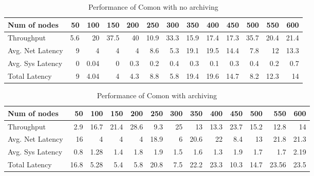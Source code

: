 \begin{table*}
\begin{center}
\begin{tabular}{|l|r|r|r|r|r|r|r|r|r|r|r|r|}\hline
Num of nodes&	50&	100&	150&	200&	250&	300&	350&	400&	450&	500&	550&	600 \\ \hline\hline
Throughput&	5.6&	20&	37.5&	40&	10.9&	33.3&	15.9&	17.4&	17.3&	35.7&	20.4&	21.4 \\ \hline
Avg. Net Latency&	9&	4&	4&	4&	8.6&	5.3&	19.1&	19.5&	14.4&	7.8&	12&	13.3 \\ \hline
Avg. Sys Latency&	0&	0.04&	0&	0.3&	0.2&	0.4&	0.3&	0.1&	0.3&	0.4&	0.2&	0.7 \\ \hline
Total Latency&	9&	4.04&	4&	4.3&	8.8&	5.8&	19.4&	19.6&	14.7&	8.2&	12.3&	14 \\ \hline
\end{tabular}
\end{center}
\caption{Performance of Comon with no archiving}
\end{table*}


\begin{table*}
\begin{center}
\begin{tabular}{|l|r|r|r|r|r|r|r|r|r|r|r|r|}\hline
Num of nodes&	50&	100&	150&	200&	250&	300&	350&	400&	450&	500&	550&	600 \\ \hline\hline
Throughput &	2.9&	16.7&	21.4&	28.6&	9.3&	25&	13&	13.3&	23.7&	15.2&	12.8&	14 \\ \hline
Avg. Net Latency&	16&	4&	4&	4&	18.9&	6&	20.6&	22&	8.4&	13&	21.8&	21.3 \\ \hline
Avg. Sys Latency &	0.8&	1.28&	1.4&	1.8&	1.9&	1.5&	1.6&	1.3&	1.9&	1.7&	1.7&	2.19 \\ \hline
Total Latency&	16.8&	5.28&	5.4&	5.8&	20.8&	7.5&	22.2&	23.3&	10.3&	14.7&	23.56&	23.5 \\ \hline
\end{tabular}
\end{center}
\caption{Performance of Comon with archiving}
\end{table*}
